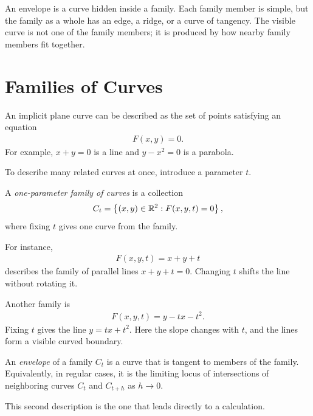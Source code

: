 \documentclass[11pt]{article}
\begin{document}
\begin{intuitionbox}
An envelope is a curve hidden inside a family. Each family member is simple, but the family as a whole has an edge, a ridge, or a curve of tangency. The visible curve is not one of the family members; it is produced by how nearby family members fit together.
\end{intuitionbox}

\section{Families of Curves}

An implicit plane curve can be described as the set of points satisfying an equation
\begin{align}
  F(x,y)=0.
\end{align}
For example, \(x+y=0\) is a line and \(y-x^2=0\) is a parabola.

To describe many related curves at once, introduce a parameter \(t\).

\begin{definitionbox}[title=One-parameter family of curves]
A \emph{one-parameter family of curves} is a collection
\begin{align}
  C_t=\left\{ (x,y)\in\mathbb{R}^2:F(x,y,t)=0 \right\},
\end{align}
where fixing \(t\) gives one curve from the family.
\end{definitionbox}

For instance,
\begin{align}
  F(x,y,t)=x+y+t
\end{align}
describes the family of parallel lines \(x+y+t=0\). Changing \(t\) shifts the line without rotating it.

Another family is
\begin{align}
  F(x,y,t)=y-tx-t^2.
\end{align}
Fixing \(t\) gives the line \(y=tx+t^2\). Here the slope changes with \(t\), and the lines form a visible curved boundary.

\begin{definitionbox}[title=Envelope]
An \emph{envelope} of a family \(C_t\) is a curve that is tangent to members of the family. Equivalently, in regular cases, it is the limiting locus of intersections of neighboring curves \(C_t\) and \(C_{t+h}\) as \(h\to 0\).
\end{definitionbox}

This second description is the one that leads directly to a calculation.
\end{document}
